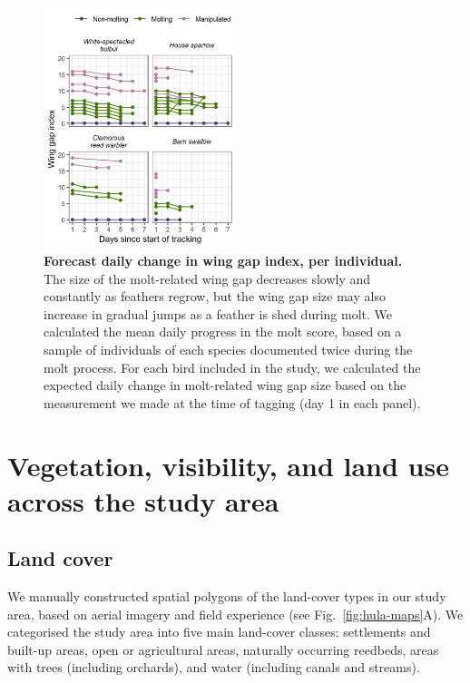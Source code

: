 \begin{figure}[!ht]
    \centering
    \includegraphics[width=0.5\textwidth]{figures/holeybirds/fig_spm_01}
    \caption{
        \textbf{Forecast daily change in wing gap index, per individual.}
        The size of the molt-related wing gap decreases slowly and constantly as feathers regrow, but the wing gap size may also increase in gradual jumps as a feather is shed during molt.
        We calculated the mean daily progress in the molt score, based on a sample of individuals of each species documented twice during the molt process.
        For each bird included in the study, we calculated the expected daily change in molt-related wing gap size based on the measurement we made at the time of tagging (day 1 in each panel).
    }
    \label{fig:wgi-daily}
\end{figure}

\section*{Vegetation, visibility, and land use across the study area}

\subsection*{Land cover}

We manually constructed spatial polygons of the land-cover types in our study area, based on aerial imagery and field experience (see Fig.~\ref{fig:hula-maps}A).
We categorised the study area into five main land-cover classes: settlements and built-up areas, open or agricultural areas, naturally occurring reedbeds, areas with trees (including orchards), and water (including canals and streams). 

